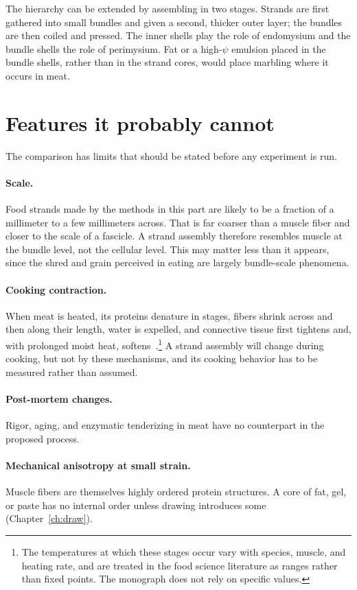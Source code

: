 \documentclass[11pt,openany]{book}
\theoremstyle{definition}
\begin{document}
The hierarchy can be extended by assembling in two stages. Strands are first gathered into small bundles and given a second, thicker outer layer; the bundles are then coiled and pressed. The inner shells play the role of endomysium and the bundle shells the role of perimysium. Fat or a high-$\psi$ emulsion placed in the bundle shells, rather than in the strand cores, would place marbling where it occurs in meat.

\section{Features it probably cannot}

The comparison has limits that should be stated before any experiment is run.

\paragraph{Scale.} Food strands made by the methods in this part are likely to be a fraction of a millimeter to a few millimeters across. That is far coarser than a muscle fiber and closer to the scale of a fascicle. A strand assembly therefore resembles muscle at the bundle level, not the cellular level. This may matter less than it appears, since the shred and grain perceived in eating are largely bundle-scale phenomena.

\paragraph{Cooking contraction.} When meat is heated, its proteins denature in stages, fibers shrink across and then along their length, water is expelled, and connective tissue first tightens and, with prolonged moist heat, softens~\cite{tornberg2005}.\footnote{The temperatures at which these stages occur vary with species, muscle, and heating rate, and are treated in the food science literature as ranges rather than fixed points. The monograph does not rely on specific values.} A strand assembly will change during cooking, but not by these mechanisms, and its cooking behavior has to be measured rather than assumed.

\paragraph{Post-mortem changes.} Rigor, aging, and enzymatic tenderizing in meat have no counterpart in the proposed process.

\paragraph{Mechanical anisotropy at small strain.} Muscle fibers are themselves highly ordered protein structures. A core of fat, gel, or paste has no internal order unless drawing introduces some (Chapter~\ref{ch:draw}).
\end{document}
